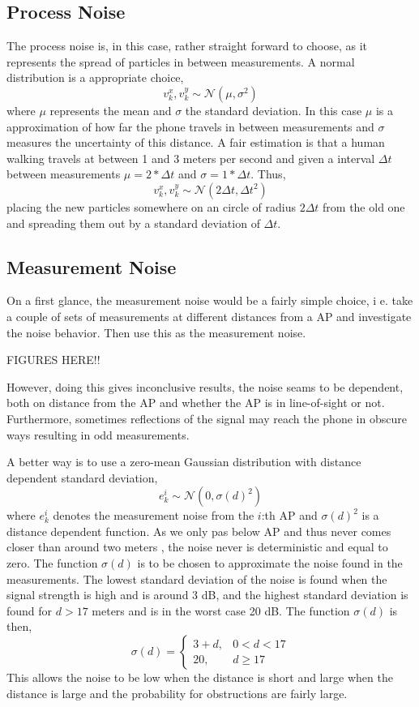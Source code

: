 \documentclass{LTHthesis}
\begin{document}
\subsection{Process Noise}
%
The process noise is, in this case, rather straight forward to choose, as it represents the spread of particles in between measurements. A normal distribution is a appropriate choice,
%
\begin{equation}
v^x_k,v^y_k\sim \mathcal{N}(\mu,\sigma^2)
\end{equation}
%
where $\mu$ represents the mean and $\sigma$ the standard deviation. In this case $\mu$ is a approximation of how far the phone travels in between measurements and $\sigma$ measures the uncertainty of this distance. A fair estimation is that a human walking travels at between 1 and 3 meters per second and given a interval $\Delta t$ between measurements $\mu = 2*\Delta t$ and $\sigma = 1*\Delta t$. Thus,
%
\begin{equation}
v^x_k,v^y_k\sim \mathcal{N}(2\Delta t, \Delta t^2)
\end{equation}
placing the new particles somewhere on an circle of radius $2\Delta t$ from the old one and spreading them out by a standard deviation of $\Delta t$.    
%
\subsection{Measurement Noise}
%
On a first glance, the measurement noise would be a fairly simple choice, i e. take a couple of sets of measurements at different distances from a AP and investigate the noise behavior. Then use this as the measurement noise. 

FIGURES HERE!!

However, doing this gives inconclusive results, the noise seams to be dependent, both on distance from the AP and whether the AP is in line-of-sight or not. Furthermore, sometimes reflections of the signal may reach the phone in obscure ways resulting in odd measurements.

A better way is to use a zero-mean Gaussian distribution with distance dependent standard deviation, 
%
\begin{equation}
e^i_k\sim \mathcal{N}(0,\sigma(d)^2)
\end{equation}
%
where $e^i_k$ denotes the measurement noise from the $i$:th AP and $\sigma(d)^2$ is a distance dependent function. As we only pas below AP and thus never comes closer than around two meters , the noise never is deterministic and equal to zero. The function $\sigma(d)$ is to be chosen to approximate the noise found in the measurements. The lowest  standard deviation of the noise is found when the signal strength is high and is around 3 dB, and the highest standard deviation is found for $d>17$ meters and is in the worst case 20 dB. The function $\sigma(d)$ is then,
%
\begin{equation}
\sigma(d) = \left \{ \begin{array}{cc}3 + d, & 0<d<17\\ 20,  & d\geq 17\end{array}\right.
\end{equation}
%
This allows the noise to be low when the distance is short and large when the distance is large and the probability for obstructions are fairly large.
%
\end{document}
